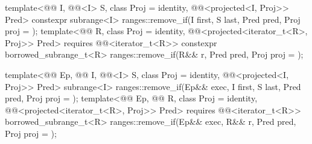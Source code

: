 \begin{itemdecl}
template<@@ I, @@<I> S, class Proj = identity,
         @@<projected<I, Proj>> Pred>
  constexpr subrange<I> ranges::remove_if(I first, S last, Pred pred, Proj proj = {});
template<@@ R, class Proj = identity,
         @@<projected<iterator_t<R>, Proj>> Pred>
  requires @@<iterator_t<R>>
  constexpr borrowed_subrange_t<R>
    ranges::remove_if(R&& r, Pred pred, Proj proj = {});

template<@@ Ep, @@ I, @@<I> S,
         class Proj = identity, @@<projected<I, Proj>> Pred>
  subrange<I>
    ranges::remove_if(Ep&& exec, I first, S last, Pred pred, Proj proj = {});
template<@@ Ep, @@ R, class Proj = identity,
         @@<projected<iterator_t<R>, Proj>> Pred>
  requires @@<iterator_t<R>>
  borrowed_subrange_t<R>
    ranges::remove_if(Ep&& exec, R&& r, Pred pred, Proj proj = {});
\end{itemdecl}

